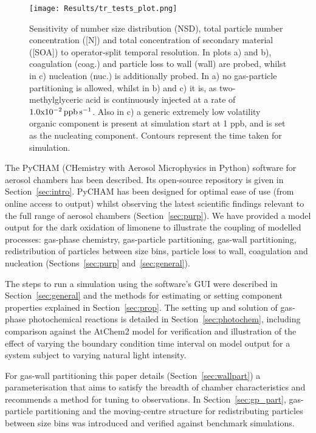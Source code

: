 \documentclass[gmd, manuscript]{copernicus}
\begin{document}
\begin{figure}[t]
\texttt{[image: Results/tr\_tests\_plot.png]}
\caption{Sensitivity of number size distribution (NSD), total particle number concentration ([N]) and total concentration of secondary material ([SOA]) to operator-split temporal resolution.  In plots a) and b), coagulation (coag.) and particle loss to wall (wall) are probed, whilst in c) nucleation (nuc.) is additionally probed.  In a) no gas-particle partitioning is allowed, whilst in b) and c) it is, as two-methylglyceric acid is continuously injected at a rate of $\rm{1.0x10^{-2}\, ppb \, s^{-1}}$.  Also in c) a generic extremely low volatility organic component is present at simulation start at 1 ppb, and is set as the nucleating component.  Contours represent the time taken for simulation.}
\label{fig:tr_tests_plot}
\end{figure}


\conclusions
The PyCHAM (CHemistry with Aerosol Microphysics in Python) software for aerosol chambers has been described.  Its open-source repository is given in Section~\ref{sec:intro}.  PyCHAM has been designed for optimal ease of use (from online access to output) whilst observing the latest scientific findings relevant to the full range of aerosol chambers (Section~\ref{sec:purp}).  We have provided a model output for the dark oxidation of limonene to illustrate the coupling of modelled processes: gas-phase chemistry, gas-particle partitioning, gas-wall partitioning, redistribution of particles between size bins, particle loss to wall, coagulation and nucleation (Sections~\ref{sec:purp} and~\ref{sec:general}).

The steps to run a simulation using the software's GUI were described in Section~\ref{sec:general} and the methods for estimating or setting component properties explained in Section~\ref{sec:prop}.  The setting up and solution of gas-phase photochemical reactions is detailed in Section~\ref{sec:photochem}, including comparison against the AtChem2 model \citep{sommariva_acm2018} for verification and illustration of the effect of varying the boundary condition time interval on model output for a system subject to varying natural light intensity.

For gas-wall partitioning this paper details (Section~\ref{sec:wallpart}) a parameterisation that aims to satisfy the breadth of chamber characteristics and recommends a method for tuning to observations.  In Section~\ref{sec:gp_part}, gas-particle partitioning and the moving-centre structure for redistributing particles between size bins was introduced and verified against benchmark simulations.
\end{document}
